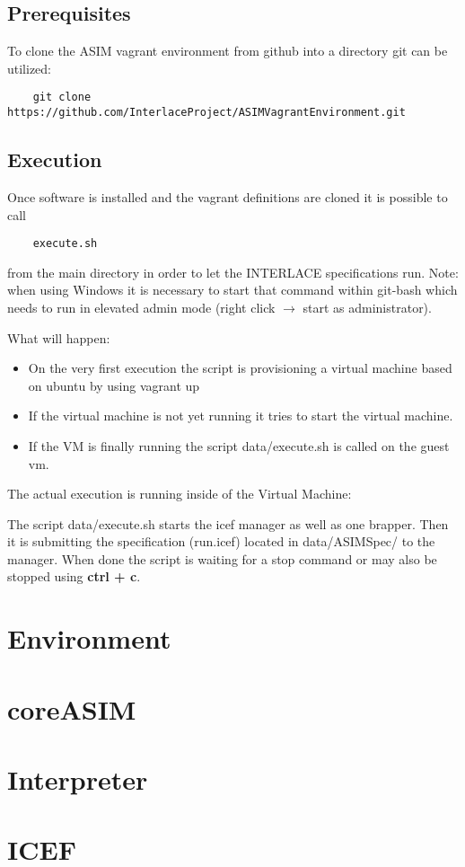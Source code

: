 \subsection{Prerequisites}

To clone the ASIM vagrant environment from github into a directory git can be utilized:

\begin{lstlisting}
	git clone https://github.com/InterlaceProject/ASIMVagrantEnvironment.git
\end{lstlisting}

\subsection{Execution}

Once software is installed and the vagrant definitions are cloned it is possible to call

\begin{lstlisting}
	execute.sh
\end{lstlisting}

from the main directory in order to let the INTERLACE specifications run. Note: when
using Windows it is necessary to start that command within git-bash which needs to run in
elevated admin mode (right click $\rightarrow$ start as administrator).

What will happen:
\begin{itemize}
	\item On the very first execution the script is provisioning a 
	virtual machine based on ubuntu by using vagrant up
	\item If the virtual machine is not yet running it tries to start
	the virtual machine.
	\item If the VM is finally running the script data/execute.sh is called on the guest vm.
\end{itemize}

The actual execution is running inside of the Virtual Machine:

The script data/execute.sh starts the icef manager as well as one brapper. Then it is submitting the specification (run.icef) located in data/ASIMSpec/ to the manager. When done the script is waiting for a stop command or may also be stopped using \textbf{ctrl + c}.

\section{Environment}

\section{coreASIM}

\section{Interpreter}

\section{ICEF}


